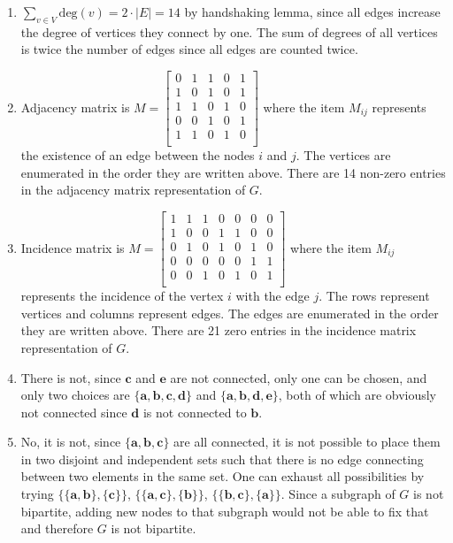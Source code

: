 \documentclass[12pt]{article}
\begin{document}
\begin{enumerate}

\item
$\displaystyle\sum_{v \in V} \text{deg}(v) = 2 \cdot |E| = 14$ by handshaking lemma, since all edges increase the degree of vertices they connect by one.
The sum of degrees of all vertices is twice the number of edges since all edges are counted twice.

\item
Adjacency matrix is $M=
\begin{bmatrix}
0 & 1 & 1 & 0 & 1 \\
1 & 0 & 1 & 0 & 1 \\
1 & 1 & 0 & 1 & 0 \\
0 & 0 & 1 & 0 & 1 \\
1 & 1 & 0 & 1 & 0 \\
\end{bmatrix}$
where the item $M_{ij}$ represents the existence of an edge between the nodes $i$ and $j$.
The vertices are enumerated in the order they are written above.
There are 14 non-zero entries in the adjacency matrix representation of $G$.

\item
Incidence matrix is $M=
\begin{bmatrix}
1 & 1 & 1 & 0 & 0 & 0 & 0 \\
1 & 0 & 0 & 1 & 1 & 0 & 0 \\
0 & 1 & 0 & 1 & 0 & 1 & 0 \\
0 & 0 & 0 & 0 & 0 & 1 & 1 \\
0 & 0 & 1 & 0 & 1 & 0 & 1 \\
\end{bmatrix}$
where the item $M_{ij}$ represents the incidence of the vertex $i$ with the edge $j$.
The rows represent vertices and columns represent edges.
The edges are enumerated in the order they are written above.
There are 21 zero entries in the incidence matrix representation of $G$.

\item
There is not, since $\textbf{c}$ and $\textbf{e}$ are not connected, only one can be chosen, and only two choices are $\{\textbf{a}, \textbf{b}, \textbf{c}, \textbf{d}\}$ and $\{\textbf{a}, \textbf{b}, \textbf{d}, \textbf{e}\}$, both of which are obviously not connected since $\textbf{d}$ is not connected to $\textbf{b}$.

\item
No, it is not, since $\{\textbf{a}, \textbf{b}, \textbf{c}\}$ are all connected, it is not possible to place them in two disjoint and independent sets such that there is no edge connecting between two elements in the same set.
One can exhaust all possibilities by trying $\{\{\textbf{a}, \textbf{b}\}, \{\textbf{c}\}\}$, $\{\{\textbf{a}, \textbf{c}\}, \{\textbf{b}\}\}$, $\{\{\textbf{b}, \textbf{c}\}, \{\textbf{a}\}\}$.
Since a subgraph of $G$ is not bipartite, adding new nodes to that subgraph would not be able to fix that and therefore $G$ is not bipartite.


\end{enumerate}
\end{document}
